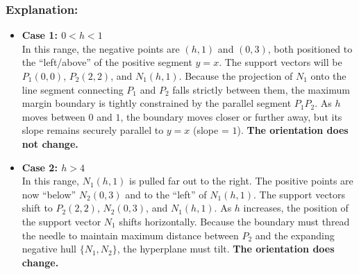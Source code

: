 \documentclass[twoside, 10pt]{article}
\begin{document}
\subsubsection*{Explanation:}
\begin{itemize}
    \item \textbf{Case 1: $0 < h < 1$} \\
    In this range, the negative points are $(h,1)$ and $(0,3)$, both positioned to the ``left/above'' of the positive segment $y=x$. The support vectors will be $P_1(0,0)$, $P_2(2,2)$, and $N_1(h,1)$. Because the projection of $N_1$ onto the line segment connecting $P_1$ and $P_2$ falls strictly between them, the maximum margin boundary is tightly constrained by the parallel segment $P_1P_2$. As $h$ moves between $0$ and $1$, the boundary moves closer or further away, but its slope remains securely parallel to $y=x$ (slope = $1$). \textbf{The orientation does not change.}    
    \item \textbf{Case 2: $h > 4$} \\
    In this range, $N_1(h,1)$ is pulled far out to the right. The positive points are now ``below'' $N_2(0,3)$ and to the ``left'' of $N_1(h,1)$. The support vectors shift to $P_2(2,2)$, $N_2(0,3)$, and $N_1(h,1)$. As $h$ increases, the position of the support vector $N_1$ shifts horizontally. Because the boundary must thread the needle to maintain maximum distance between $P_2$ and the expanding negative hull $\{N_1, N_2\}$, the hyperplane must tilt. \textbf{The orientation does change.}
\end{itemize}
\end{document}
